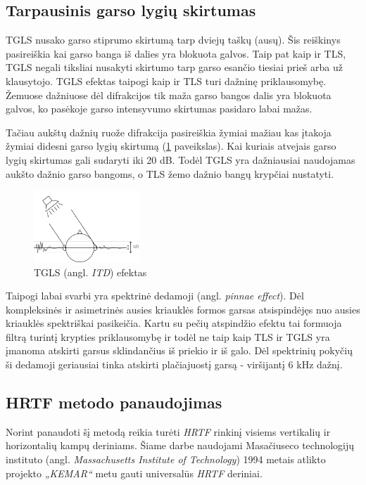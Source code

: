 \documentclass[]{vgtuef}
\begin{document}
\subsection{Tarpausinis garso lygių skirtumas}
TGLS nusako garso stiprumo skirtumą tarp dviejų taškų (ausų). Šis reiškinys pasireiškia kai garso banga iš dalies yra blokuota galvos. Taip pat kaip ir TLS, TGLS negali tiksliai nusakyti skirtumo tarp garso esančio tiesiai prieš arba už klausytojo. TGLS efektas taipogi kaip ir TLS turi dažninę priklausomybę. Žemuose dažniuose dėl difrakcijos tik maža garso bangos dalis yra blokuota galvos, ko pasėkoje garso intensyvumo skirtumas pasidaro labai mažas.

Tačiau aukštų dažnių ruože difrakcija pasireiškia žymiai mažiau kas įtakoja žymiai didesni garso lygių skirtumą (\ref{fig:ILD_1} paveikslas). Kai kuriais atvejais garso lygių skirtumas gali sudaryti iki 20 dB. Todėl TGLS yra dažniausiai naudojamas aukšto dažnio garso bangoms, o TLS žemo dažnio bangų krypčiai nustatyti. 

\begin{figure}[!ht]
  \centering
  \includegraphics[width=150px]{img/ILD.jpg}
  \caption{TGLS (angl. \textit{ITD}) efektas}
  \label{fig:ILD_1}
\end{figure}

Taipogi labai svarbi yra spektrinė dedamoji (angl. \textit{pinnae effect}). Dėl kompleksinės ir asimetrinės ausies kriauklės formos garsas atsispindėjęs nuo ausies kriauklės spektriškai pasikeičia.  Kartu su pečių atspindžio efektu tai formuoja filtrą turintį krypties priklausomybę ir todėl ne taip kaip TLS ir TGLS yra įmanoma atskirti garsus sklindančius iš priekio ir iš galo. Dėl spektrinių pokyčių ši dedamoji geriausiai tinka atskirti plačiajuostį garsą - viršijantį 6 kHz dažnį.


\subsection{HRTF metodo panaudojimas}

Norint panaudoti šį metodą reikia turėti \textit{HRTF} rinkinį visiems vertikalių ir horizontalių kampų deriniams. Šiame darbe naudojami Masačiuseco technologijų instituto (angl. \textit{Massachusetts Institute of Technology}) 1994 metais atlikto projekto \textit{„KEMAR“} metu gauti universalūs \textit{HRTF} deriniai.
\end{document}
